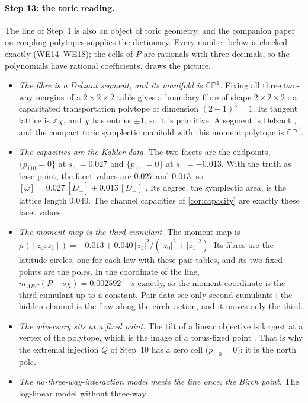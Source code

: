 \documentclass[11pt]{article}
\theoremstyle{definition}\newtheorem{definition}{Definition}\newtheorem{remark}{Remark}
\begin{document}
\paragraph{Step 13: the toric reading.} The line of Step~1 is also an object of toric geometry, and the companion paper on coupling
polytopes \cite{Coupling} supplies the dictionary. Every number below is checked exactly (WE14--WE18); the cells of $P$ are rationals
with three decimals, so the polynomials have rational coefficients.  draws the picture.
\begin{itemize}
\item \emph{The fibre is a Delzant segment, and its manifold is $\mathbb{CP}^1$.} Fixing all three two-way margins of a $2\times2\times2$
  table gives a boundary fibre of shape $2\times2\times2$ \cite[Prop.~10.5(i)]{Coupling}: a capacitated transportation polytope of
  dimension $(2-1)^3=1$. Its tangent lattice is $\mathbb Z\chi$, and $\chi$ has entries $\pm1$, so it is primitive. A segment is
  Delzant \cite{Delzant1988}, and the compact toric symplectic manifold with this moment polytope is $\mathbb{CP}^1$.
\item \emph{The capacities are the Kähler data.} The two facets are the endpoints, $\{p_{110}=0\}$ at $s_+=0.027$ and
  $\{p_{111}=0\}$ at $s_-=-0.013$. With the truth as base point, the facet values are $0.027$ and $0.013$, so
  $[\omega]=0.027\,[D_+]+0.013\,[D_-]$ \cite[Prop.~2.2]{Coupling}. Its degree, the symplectic area, is the lattice length $0.040$.
  The channel capacities of \cref{cor:capacity} are exactly these facet values.
\item \emph{The moment map is the third cumulant.} The moment map is $\mu([z_0:z_1])=-0.013+0.040\,|z_1|^2/(|z_0|^2+|z_1|^2)$. Its
  fibres are the latitude circles, one for each law with these pair tables, and its two fixed points are the poles. In the coordinate
  of the line, $m_{ABC}(P+s\chi)=0.002592+s$ exactly, so the moment coordinate is the third cumulant up to a constant. Pair data see
  only second cumulants \cite[Props.~9.1--9.2]{Coupling}; the hidden channel is the flow along the circle action, and it moves only
  the third.
\item \emph{The adversary sits at a fixed point.} The tilt of a linear objective is largest at a vertex of the polytope, which is the
  image of a torus-fixed point \cite[Prop.~6.4]{Coupling}. That is why the extremal injection $Q$ of Step~10 has a zero cell
  ($p_{110}=0$): it is the north pole.
\item \emph{The no-three-way-interaction model meets the line once: the Birch point.} The log-linear model without three-way

\end{itemize}
\end{document}
